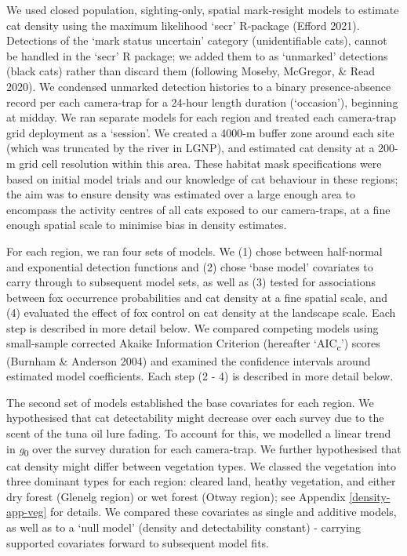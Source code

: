 \documentclass[11pt,a4paper,titlepage,twoside,openright]{style/unimelbthesis}
\begin{document}
\begin{mainmatter}
We used closed population, sighting-only, spatial mark-resight models to estimate cat density using the maximum likelihood `secr' R-package (Efford 2021). Detections of the `mark status uncertain' category (unidentifiable cats), cannot be handled in the `secr' R package; we added them to as `unmarked' detections (black cats) rather than discard them (following Moseby, McGregor, \& Read 2020). We condensed unmarked detection histories to a binary presence-absence record per each camera-trap for a 24-hour length duration (`occasion'), beginning at midday. We ran separate models for each region and treated each camera-trap grid deployment as a `session'. We created a 4000-m buffer zone around each site (which was truncated by the river in LGNP), and estimated cat density at a 200-m grid cell resolution within this area. These habitat mask specifications were based on initial model trials and our knowledge of cat behaviour in these regions; the aim was to ensure density was estimated over a large enough area to encompass the activity centres of all cats exposed to our camera-traps, at a fine enough spatial scale to minimise bias in density estimates.

For each region, we ran four sets of models. We (1) chose between half-normal and exponential detection functions and (2) chose `base model' covariates to carry through to subsequent model sets, as well as (3) tested for associations between fox occurrence probabilities and cat density at a fine spatial scale, and (4) evaluated the effect of fox control on cat density at the landscape scale. Each step is described in more detail below. We compared competing models using small-sample corrected Akaike Information Criterion (hereafter `AIC\textsubscript{c}') scores (Burnham \& Anderson 2004) and examined the confidence intervals around estimated model coefficients. Each step (2 - 4) is described in more detail below.

The second set of models established the base covariates for each region. We hypothesised that cat detectability might decrease over each survey due to the scent of the tuna oil lure fading. To account for this, we modelled a linear trend in \emph{g}\textsubscript{0} over the survey duration for each camera-trap. We further hypothesised that cat density might differ between vegetation types. We classed the vegetation into three dominant types for each region: cleared land, heathy vegetation, and either dry forest (Glenelg region) or wet forest (Otway region); see Appendix \ref{density-app-veg} for details. We compared these covariates as single and additive models, as well as to a `null model' (density and detectability constant) - carrying supported covariates forward to subsequent model fits.


\end{mainmatter}
\end{document}
